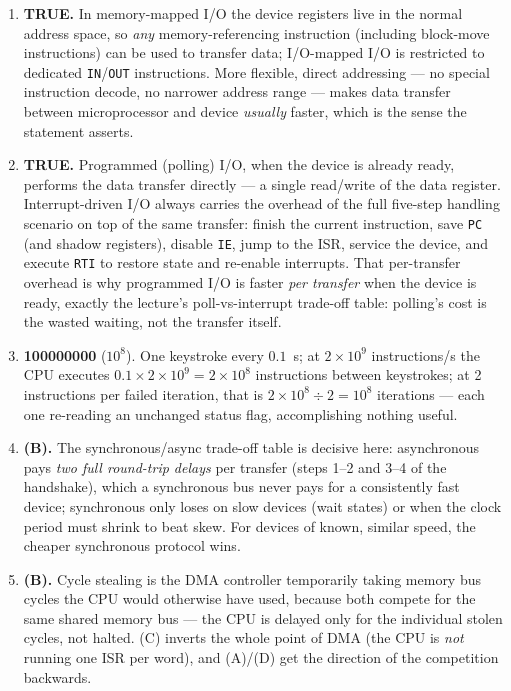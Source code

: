 \documentclass[11pt]{article}
\begin{document}
\begin{enumerate}
\item[\textbf{Q6}] \textbf{TRUE.} In memory-mapped I/O the device registers live in the normal address space, so \emph{any} memory-referencing instruction (including block-move instructions) can be used to transfer data; I/O-mapped I/O is restricted to dedicated \texttt{IN}/\texttt{OUT} instructions. More flexible, direct addressing --- no special instruction decode, no narrower address range --- makes data transfer between microprocessor and device \emph{usually} faster, which is the sense the statement asserts.

\item[\textbf{Q7}] \textbf{TRUE.} Programmed (polling) I/O, when the device is already ready, performs the data transfer directly --- a single read/write of the data register. Interrupt-driven I/O always carries the overhead of the full five-step handling scenario on top of the same transfer: finish the current instruction, save \texttt{PC} (and shadow registers), disable \texttt{IE}, jump to the ISR, service the device, and execute \texttt{RTI} to restore state and re-enable interrupts. That per-transfer overhead is why programmed I/O is faster \emph{per transfer} when the device is ready, exactly the lecture's poll-vs-interrupt trade-off table: polling's cost is the wasted waiting, not the transfer itself.

\item[\textbf{Q8}] \textbf{100000000} ($10^8$). One keystroke every $0.1$~s; at $2\times10^9$ instructions/s the CPU executes $0.1\times 2\times10^9=2\times10^8$ instructions between keystrokes; at 2 instructions per failed iteration, that is $2\times10^8 \div 2 = 10^8$ iterations --- each one re-reading an unchanged status flag, accomplishing nothing useful.

\item[\textbf{Q9}] \textbf{(B).} The synchronous/async trade-off table is decisive here: asynchronous pays \emph{two full round-trip delays} per transfer (steps 1--2 and 3--4 of the handshake), which a synchronous bus never pays for a consistently fast device; synchronous only loses on slow devices (wait states) or when the clock period must shrink to beat skew. For devices of known, similar speed, the cheaper synchronous protocol wins.

\item[\textbf{Q10}] \textbf{(B).} Cycle stealing is the DMA controller temporarily taking memory bus cycles the CPU would otherwise have used, because both compete for the same shared memory bus --- the CPU is delayed only for the individual stolen cycles, not halted. (C) inverts the whole point of DMA (the CPU is \emph{not} running one ISR per word), and (A)/(D) get the direction of the competition backwards.


\end{enumerate}
\end{document}
